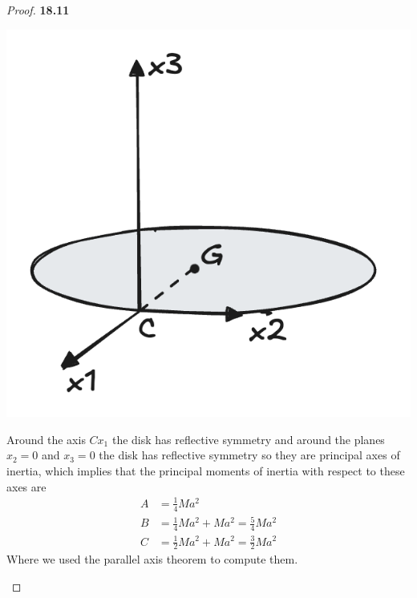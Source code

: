 \documentclass[11pt]{article}
\theoremstyle{definition}
\begin{document}
\begin{proof}{\textbf{18.11}}
\begin{itemize}
\begin{center}
        \includegraphics[scale=0.25]{ch18-11-ii.png}
    \end{center}
    Around the axis $Cx_1$ the disk has reflective symmetry and around the
    planes $x_2 = 0$ and $x_3 = 0$ the disk has reflective symmetry so they are
    principal axes of inertia, which implies that the principal moments of
    inertia with respect to these axes are
    \begin{align*}
        A &= \frac{1}{4}Ma^2\\
        B &= \frac{1}{4}Ma^2 + Ma^2 = \frac{5}{4}Ma^2\\
        C &= \frac{1}{2}Ma^2 + Ma^2 = \frac{3}{2}Ma^2
    \end{align*}
    Where we used the parallel axis theorem to compute them.
    
\end{itemize}
\end{proof}
\cleardoublepage
\end{document}
